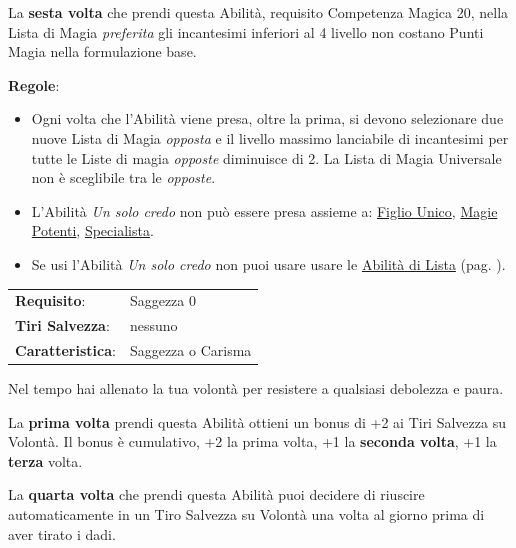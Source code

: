 \begin{multicols}{2}
La \textbf{sesta volta} che prendi questa Abilità, requisito Competenza Magica 20, nella Lista di Magia \emph{preferita} gli incantesimi inferiori al 4 livello non costano Punti Magia nella formulazione base.

\medskip

\textbf{Regole}:

\smallskip

\begin{itemize}[leftmargin=*] \setlength{\itemsep}{0pt}
\item Ogni volta che l'Abilità viene presa, oltre la prima, si devono selezionare due nuove Lista di Magia \emph{opposta} e il livello massimo lanciabile di incantesimi per tutte le Liste di magia \emph{opposte} diminuisce di 2.  La Lista di Magia Universale non è sceglibile tra le \emph{opposte}.

\item L'Abilità \emph{Un solo credo} non può essere presa assieme a: \hyperlink{figliounico}{Figlio Unico}, \hyperlink{magiepotenti}{Magie Potenti}, \hyperlink{specialista}{Specialista}.

\item Se usi l'Abilità \emph{Un solo credo} non puoi usare usare le \hyperlink{abilitadilista}{Abilità di Lista} (pag. \pageref{abilitadilista}).
\end{itemize}

\hspace{-0.2cm}\begin{tabularx}{\linewidth}{l@{\hspace{8pt}}X}
\rowcolor{gray!20}\textbf{Requisito}: & Saggezza 0\\
\textbf{Tiri Salvezza}: & nessuno\\
\rowcolor{gray!20}\textbf{Caratteristica}: & Saggezza o Carisma\\
\end{tabularx}\smallskip

Nel tempo hai allenato la tua volontà per resistere a qualsiasi debolezza e paura.

La \textbf{prima volta} prendi questa Abilità ottieni un bonus di +2 ai Tiri Salvezza su Volontà. Il bonus è cumulativo, +2 la prima volta, +1 la \textbf{seconda volta}, +1 la \textbf{terza} volta.

La \textbf{quarta volta} che prendi questa Abilità puoi decidere di riuscire automaticamente in un Tiro Salvezza su Volontà una volta al giorno prima di aver tirato i dadi.


\end{multicols}
